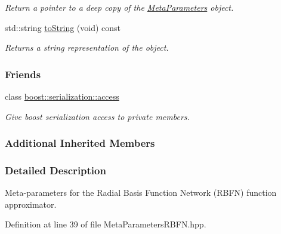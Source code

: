 \begin{DoxyCompactItemize}
\begin{DoxyCompactList}\small\item\em Return a pointer to a deep copy of the \hyperlink{classDmpBbo_1_1MetaParameters}{Meta\+Parameters} object. \end{DoxyCompactList}\item 
std\+::string \hyperlink{classDmpBbo_1_1MetaParametersRBFN_a1aca816b42cf0d36118be0ab91120d77}{to\+String} (void) const 
\begin{DoxyCompactList}\small\item\em Returns a string representation of the object. \end{DoxyCompactList}\end{DoxyCompactItemize}
\subsubsection*{Friends}
\begin{DoxyCompactItemize}
\item 
class \hyperlink{classDmpBbo_1_1MetaParametersRBFN_ac98d07dd8f7b70e16ccb9a01abf56b9c}{boost\+::serialization\+::access}
\begin{DoxyCompactList}\small\item\em Give boost serialization access to private members. \end{DoxyCompactList}\end{DoxyCompactItemize}
\subsubsection*{Additional Inherited Members}


\subsubsection{Detailed Description}
Meta-\/parameters for the Radial Basis Function Network (R\+B\+F\+N) function approximator. 

Definition at line 39 of file Meta\+Parameters\+R\+B\+F\+N.\+hpp.



